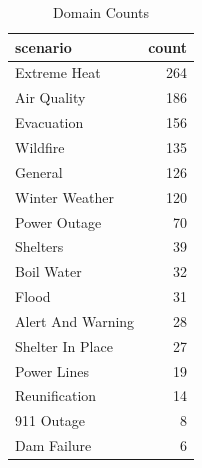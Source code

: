 \begin{table}
\caption{Domain Counts}
\label{tab:domain_counts}
\begin{tabular}{lr}
\toprule
scenario & count \\
\midrule
Extreme Heat & 264 \\
Air Quality & 186 \\
Evacuation & 156 \\
Wildfire & 135 \\
General & 126 \\
Winter Weather & 120 \\
Power Outage & 70 \\
Shelters & 39 \\
Boil Water & 32 \\
Flood & 31 \\
Alert And Warning & 28 \\
Shelter In Place & 27 \\
Power Lines & 19 \\
Reunification & 14 \\
911 Outage & 8 \\
Dam Failure & 6 \\
\bottomrule
\end{tabular}
\end{table}
